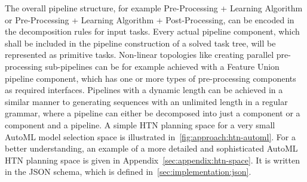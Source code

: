 The overall pipeline structure, for example Pre-Processing + Learning Algorithm or Pre-Processing + Learning Algorithm + Post-Processing, can be encoded in the decomposition rules for input tasks.
Every actual pipeline component, which shall be included in the pipeline construction of a solved task tree, will be represented as primitive tasks.\newline
Non-linear topologies like creating parallel pre-processing sub-pipelines can be for example achieved with a Feature Union pipeline component, which has one or more types of pre-processing components as required interfaces.
Pipelines with a dynamic length can be achieved in a similar manner to generating sequences with an unlimited length in a regular grammar, where a pipeline can either be decomposed into just a component or a component and a pipeline.\newline
A simple HTN planning space for a very small AutoML model selection space is illustrated in~\ref{fig:approach:htn-automl}.
For a better understanding, an example of a more detailed and sophisticated AutoML HTN planning space is given in Appendix~\ref{sec:appendix:htn-space}.
It is written in the JSON schema, which is defined in~\ref{sec:implementation:json}.
